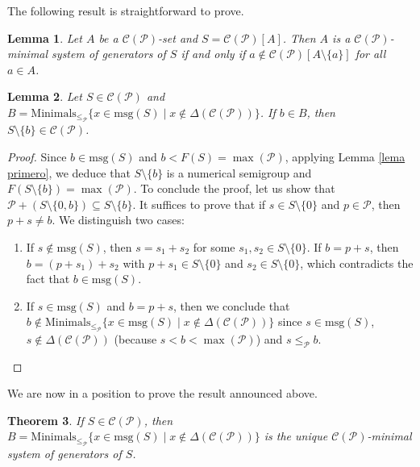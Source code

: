 \documentclass[11pt]{article}
\newtheorem{theorem}{Theorem}[section]
\newtheorem{lemma}[theorem]{Lemma}
\numberwithin{equation}{section}
\begin{document}
The following result is straightforward to prove.

\begin{lemma}
    Let $A$ be a $\mathcal C(\mathcal P)$-set and $S=\mathcal C(\mathcal P)[A]$. Then $A$ is a $\mathcal C(\mathcal P)$-minimal system of generators of $S$ if and only if $a\notin\mathcal C(\mathcal P)[A\setminus\{a\}]$ for all $a\in A$.
\end{lemma}

\begin{lemma}\label{lema minimales y B sin b}
    Let $S\in\mathcal C(\mathcal P)$ and $B=\mathrm{Minimals}_{\leq_\mathcal P}\{x\in\mathrm{msg}(S)\mid x\notin\Delta(\mathcal C(\mathcal P))\}$. If $b\in B$, then $S\setminus\{b\}\in\mathcal C(\mathcal P)$.
\end{lemma}

\begin{proof}
    Since $b\in\mathrm{msg}(S)$ and $b<F(S)=\max(\mathcal P)$, applying Lemma \ref{lema primero}, we deduce that $S\setminus\{b\}$ is a numerical semigroup and $F(S\setminus\{b\})=\max(\mathcal P)$. To conclude the proof, let us show that $\mathcal P+(S\setminus\{0,b\})\subseteq S\setminus\{b\}$. It suffices to prove that if $s\in S\setminus\{0\}$ and $p\in\mathcal P$, then $p+s\ne b$. We distinguish two cases:
    \begin{enumerate}
        \item If $s\notin\mathrm{msg}(S)$, then $s=s_1+s_2$ for some $s_1,s_2\in S\setminus\{0\}$. If $b=p+s$, then $b=(p+s_1)+s_2$ with $p+s_1\in S\setminus\{0\}$ and $s_2\in S\setminus\{0\}$, which contradicts the fact that $b\in\mathrm{msg}(S)$.
        \item If $s\in\mathrm{msg}(S)$ and $b=p+s$, then we conclude that $b\notin\mathrm{Minimals}_{\leq_\mathcal P}\{x\in\mathrm{msg}(S)\mid x\notin \Delta(\mathcal C(\mathcal P))\}$ since $s\in\mathrm{msg}(S)$, $s\notin\Delta(\mathcal C(\mathcal P))$ (because $s<b<\max(\mathcal P)$) and $s\leq_{\mathcal P}b$.
    \end{enumerate}
\end{proof}

We are now in a position to prove the result announced above.

\begin{theorem}\label{teorema}
    If $S\in \mathcal C(\mathcal P)$, then $B=\mathrm{Minimals}_{\leq_\mathcal P}\{x\in\mathrm{msg}(S)\mid x\notin\Delta(\mathcal C(\mathcal P))\}$ is the unique $\mathcal C(\mathcal P)$-minimal system of generators of $S$.
\end{theorem}
\end{document}
